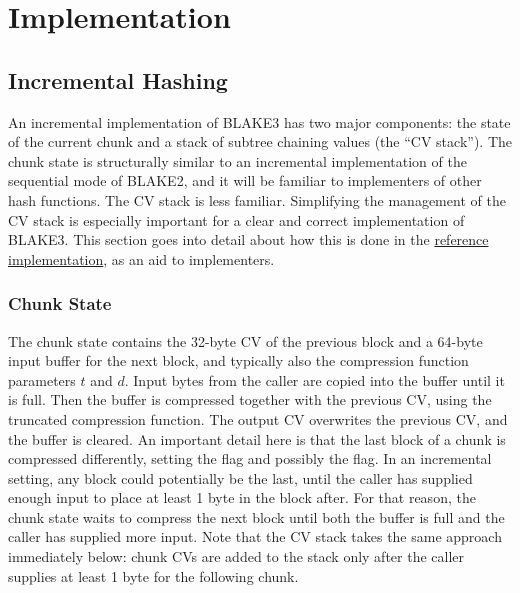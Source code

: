 \documentclass[11pt,notitlepage,a4paper]{article}
\newcommand{\flag}[1]{\texttt{\detokenize{#1}}\xspace}
\begin{document}
\section{Implementation}\label{sec:implementation}

\subsection{Incremental Hashing}\label{sec:incremental}

An incremental implementation of BLAKE3 has two major components: the state of
the current chunk and a stack of subtree chaining values (the ``CV stack'').
The chunk state is structurally similar to an incremental implementation of the
sequential mode of BLAKE2, and it will be familiar to implementers of other
hash functions. The CV stack is less familiar. Simplifying the management of
the CV stack is especially important for a clear and correct implementation of
BLAKE3. This section goes into detail about how this is done in the
\href{https://github.com/veorq/BLAKE3/blob/master/reference_impl/reference_impl.rs}{reference
implementation}, as an aid to implementers.

\subsubsection{Chunk State}\label{sec:chunkstate}

The chunk state contains the 32-byte CV of the previous block and a 64-byte
input buffer for the next block, and typically also the compression function
parameters $t$ and $d$. Input bytes from the caller are copied into the buffer
until it is full. Then the buffer is compressed together with the previous CV,
using the truncated compression function. The output CV overwrites the previous
CV, and the buffer is cleared. An important detail here is that the last block
of a chunk is compressed differently, setting the \flag{CHUNK_END} flag and
possibly the \flag{ROOT} flag. In an incremental setting, any block could
potentially be the last, until the caller has supplied enough input to place at
least 1 byte in the block after. For that reason, the chunk state waits to
compress the next block until both the buffer is full and the caller has
supplied more input. Note that the CV stack takes the same approach immediately
below: chunk CVs are added to the stack only after the caller supplies at least
1 byte for the following chunk.
\end{document}
